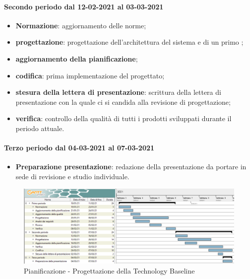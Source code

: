 \paragraph{Secondo periodo dal 12-02-2021 al 03-03-2021} 
\begin{itemize} 
	\item \textbf{Normazione}: aggiornamento delle norme; 
	\item \textbf{progettazione}: progettazione dell'architettura del sistema e di un primo ;
	\item \textbf{aggiornamento della pianificazione}; 
	\item \textbf{codifica}: prima implementazione del  progettato; 
	\item \textbf{stesura della lettera di presentazione}: scrittura della lettera di presentazione con la quale ci 
	si candida alla revisione di progettazione; 
	\item \textbf{verifica}: controllo della qualità di tutti i prodotti sviluppati durante il periodo attuale. 
\end{itemize}	 

\paragraph{Terzo periodo dal 04-03-2021 al 07-03-2021} 
\begin{itemize} 
	\item \textbf{Preparazione presentazione}: redazione della presentazione da portare in sede di revisione e studio individuale. 
\end{itemize} 

\newpage 

\begin{landscape} 
	\begin{figure}[h!] 
		\includegraphics[width=24cm]{images/3_Progettazione_della_Technology.png} 
		\caption{Pianificazione - Progettazione della Technology Baseline} 
	\end{figure} 
\end{landscape} 


